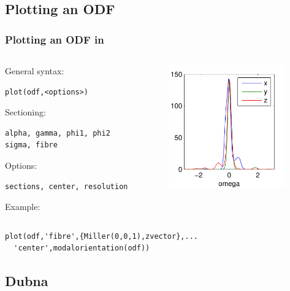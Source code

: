 \subsection*{Plotting an ODF}

\begin{frame}[fragile]
  \frametitle{Plotting  an ODF in \MTEX}

  \begin{columns}
    \begin{column}{6.5cm}
      General syntax:
\begin{lstlisting}
plot(odf,<options>)
\end{lstlisting}

      Sectioning:
\begin{lstlisting}
alpha, gamma, phi1, phi2
sigma, fibre
\end{lstlisting}

      Options:
\begin{lstlisting}
sections, center, resolution
\end{lstlisting}

      Example:
    \end{column}
    \begin{column}{5cm}
      \includegraphics[width=5cm]{pic/radialplot}
    \end{column}
  \end{columns}

\begin{lstlisting}
plot(odf,'fibre',{Miller(0,0,1),zvector},...
  'center',modalorientation(odf))
\end{lstlisting}


\end{frame}


\subsection*{Dubna}

